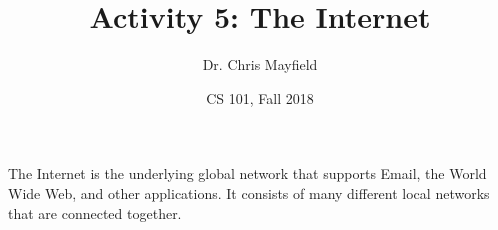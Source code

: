 \documentclass[12pt]{article}
\title{Activity 5: The Internet}
\author{Dr. Chris Mayfield}
\date{CS 101, Fall 2018}
\begin{document}
\maketitle

The Internet is the underlying global network that supports Email, the World Wide Web, and other applications. It consists of many different local networks that are connected together.


\newpage

\end{document}
